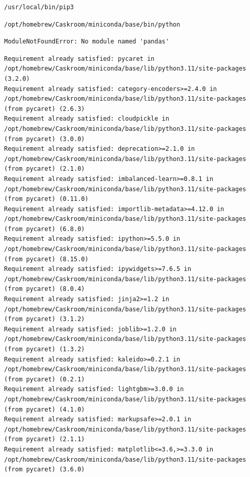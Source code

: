 \documentclass[
  letterpaper,
  DIV=11,
  numbers=noendperiod]{scrartcl}
\begin{document}
\begin{verbatim}
/usr/local/bin/pip3
\end{verbatim}

\begin{verbatim}
/opt/homebrew/Caskroom/miniconda/base/bin/python
\end{verbatim}

\begin{verbatim}
ModuleNotFoundError: No module named 'pandas'
\end{verbatim}

\begin{verbatim}
Requirement already satisfied: pycaret in /opt/homebrew/Caskroom/miniconda/base/lib/python3.11/site-packages (3.2.0)
Requirement already satisfied: category-encoders>=2.4.0 in /opt/homebrew/Caskroom/miniconda/base/lib/python3.11/site-packages (from pycaret) (2.6.3)
Requirement already satisfied: cloudpickle in /opt/homebrew/Caskroom/miniconda/base/lib/python3.11/site-packages (from pycaret) (3.0.0)
Requirement already satisfied: deprecation>=2.1.0 in /opt/homebrew/Caskroom/miniconda/base/lib/python3.11/site-packages (from pycaret) (2.1.0)
Requirement already satisfied: imbalanced-learn>=0.8.1 in /opt/homebrew/Caskroom/miniconda/base/lib/python3.11/site-packages (from pycaret) (0.11.0)
Requirement already satisfied: importlib-metadata>=4.12.0 in /opt/homebrew/Caskroom/miniconda/base/lib/python3.11/site-packages (from pycaret) (6.8.0)
Requirement already satisfied: ipython>=5.5.0 in /opt/homebrew/Caskroom/miniconda/base/lib/python3.11/site-packages (from pycaret) (8.15.0)
Requirement already satisfied: ipywidgets>=7.6.5 in /opt/homebrew/Caskroom/miniconda/base/lib/python3.11/site-packages (from pycaret) (8.0.4)
Requirement already satisfied: jinja2>=1.2 in /opt/homebrew/Caskroom/miniconda/base/lib/python3.11/site-packages (from pycaret) (3.1.2)
Requirement already satisfied: joblib>=1.2.0 in /opt/homebrew/Caskroom/miniconda/base/lib/python3.11/site-packages (from pycaret) (1.3.2)
Requirement already satisfied: kaleido>=0.2.1 in /opt/homebrew/Caskroom/miniconda/base/lib/python3.11/site-packages (from pycaret) (0.2.1)
Requirement already satisfied: lightgbm>=3.0.0 in /opt/homebrew/Caskroom/miniconda/base/lib/python3.11/site-packages (from pycaret) (4.1.0)
Requirement already satisfied: markupsafe>=2.0.1 in /opt/homebrew/Caskroom/miniconda/base/lib/python3.11/site-packages (from pycaret) (2.1.1)
Requirement already satisfied: matplotlib<=3.6,>=3.3.0 in /opt/homebrew/Caskroom/miniconda/base/lib/python3.11/site-packages (from pycaret) (3.6.0)

\end{verbatim}
\end{document}
